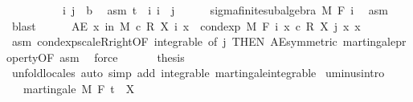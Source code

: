 \begin{isabellebody}
%
\isadelimproof
%
\endisadelimproof
%
\isatagproof
{}\isamarkupfalse%
\ {\isacharminus}{\kern0pt}\isanewline
\ \ \isacommand{{\isacharbraceleft}{\kern0pt}}\isamarkupfalse%
\isanewline
\ \ \ \ \isamarkupfalse%
\ i\ j\ {\isacharcolon}{\kern0pt}{\isacharcolon}{\kern0pt}\ {\isacharprime}{\kern0pt}b\ \isamarkupfalse%
\ asm{\isacharcolon}{\kern0pt}\ {\isachardoublequoteopen}t\ {\isasymle}\ i{\isachardoublequoteclose}\ {\isachardoublequoteopen}i\ {\isasymle}\ j{\isachardoublequoteclose}\isanewline
\ \ \ \ \isamarkupfalse%
\ sigma{\isacharunderscore}{\kern0pt}finite{\isacharunderscore}{\kern0pt}subalgebra\ M\ {\isachardoublequoteopen}F\ i{\isachardoublequoteclose}\ \isamarkupfalse%
\ asm\ \isamarkupfalse%
\ blast\isanewline
\ \ \ \ \isamarkupfalse%
\ {\isachardoublequoteopen}AE\ x\ in\ M{\isachardot}{\kern0pt}\ c\ {\isacharasterisk}{\kern0pt}\isactrlsub R\ X\ i\ x\ {\isacharequal}{\kern0pt}\ cond{\isacharunderscore}{\kern0pt}exp\ M\ {\isacharparenleft}{\kern0pt}F\ i{\isacharparenright}{\kern0pt}\ {\isacharparenleft}{\kern0pt}{\isasymlambda}x{\isachardot}{\kern0pt}\ c\ {\isacharasterisk}{\kern0pt}\isactrlsub R\ X\ j\ x{\isacharparenright}{\kern0pt}\ x{\isachardoublequoteclose}\ \isamarkupfalse%
\ asm\ cond{\isacharunderscore}{\kern0pt}exp{\isacharunderscore}{\kern0pt}scaleR{\isacharunderscore}{\kern0pt}right{\isacharbrackleft}{\kern0pt}OF\ integrable{\isacharcomma}{\kern0pt}\ of\ j{\isacharcomma}{\kern0pt}\ THEN\ AE{\isacharunderscore}{\kern0pt}symmetric{\isacharbrackright}{\kern0pt}\ martingale{\isacharunderscore}{\kern0pt}property{\isacharbrackleft}{\kern0pt}OF\ asm{\isacharbrackright}{\kern0pt}\ \isamarkupfalse%
\ force\isanewline
\ \ \isacommand{{\isacharbraceright}{\kern0pt}}\isamarkupfalse%
\isanewline
\ \ \isamarkupfalse%
\ {\isacharquery}{\kern0pt}thesis\ \isamarkupfalse%
\ {\isacharparenleft}{\kern0pt}unfold{\isacharunderscore}{\kern0pt}locales{\isacharparenright}{\kern0pt}\ {\isacharparenleft}{\kern0pt}auto\ simp\ add{\isacharcolon}{\kern0pt}\ integrable\ martingale{\isachardot}{\kern0pt}integrable{\isacharparenright}{\kern0pt}\isanewline
{}\isamarkupfalse%
%
\endisatagproof
{\isafoldproof}%
%
\isadelimproof
\isanewline
%
\endisadelimproof
\isanewline
{}\isamarkupfalse%
\ uminus{\isacharbrackleft}{\kern0pt}intro{\isacharbrackright}{\kern0pt}{\isacharcolon}{\kern0pt}\isanewline
\ \ \ {\isachardoublequoteopen}martingale\ M\ F\ t\ {\isacharparenleft}{\kern0pt}{\isacharminus}{\kern0pt}\ X{\isacharparenright}{\kern0pt}{\isachardoublequoteclose}\ \isanewline

\end{isabellebody}
